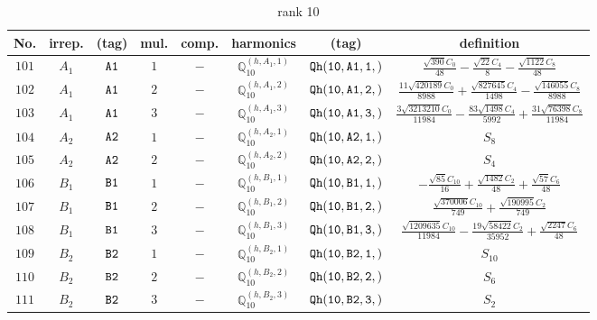 \documentclass[fleqn,8pt]{jsarticle}
\begin{document}
\begin{table}[ht!]
\begin{center}
\caption{rank 10}
\renewcommand{\arraystretch}{1.3}
\begin{tabular}{cccccccc} \hline \hline
No. & irrep. & (tag) & mul. & comp. & harmonics & (tag) & definition \\ \hline
$ 101 $ & $ A_{1} $ & $ {\tt A1} $ & $ 1 $ & $ - $ & $ \mathbb{Q}_{10}^{(h,A_{1},1)} $ & $ {\tt Qh(10,A1,1,)} $ & $ \frac{\sqrt{390} C_{0}}{48} - \frac{\sqrt{22} C_{4}}{8} - \frac{\sqrt{1122} C_{8}}{48} $ \\
$ 102 $ & $ A_{1} $ & $ {\tt A1} $ & $ 2 $ & $ - $ & $ \mathbb{Q}_{10}^{(h,A_{1},2)} $ & $ {\tt Qh(10,A1,2,)} $ & $ \frac{11 \sqrt{420189} C_{0}}{8988} + \frac{\sqrt{827645} C_{4}}{1498} - \frac{\sqrt{146055} C_{8}}{8988} $ \\
$ 103 $ & $ A_{1} $ & $ {\tt A1} $ & $ 3 $ & $ - $ & $ \mathbb{Q}_{10}^{(h,A_{1},3)} $ & $ {\tt Qh(10,A1,3,)} $ & $ \frac{3 \sqrt{3213210} C_{0}}{11984} - \frac{83 \sqrt{1498} C_{4}}{5992} + \frac{31 \sqrt{76398} C_{8}}{11984} $ \\
$ 104 $ & $ A_{2} $ & $ {\tt A2} $ & $ 1 $ & $ - $ & $ \mathbb{Q}_{10}^{(h,A_{2},1)} $ & $ {\tt Qh(10,A2,1,)} $ & $ S_{8} $ \\
$ 105 $ & $ A_{2} $ & $ {\tt A2} $ & $ 2 $ & $ - $ & $ \mathbb{Q}_{10}^{(h,A_{2},2)} $ & $ {\tt Qh(10,A2,2,)} $ & $ S_{4} $ \\
$ 106 $ & $ B_{1} $ & $ {\tt B1} $ & $ 1 $ & $ - $ & $ \mathbb{Q}_{10}^{(h,B_{1},1)} $ & $ {\tt Qh(10,B1,1,)} $ & $ - \frac{\sqrt{85} C_{10}}{16} + \frac{\sqrt{1482} C_{2}}{48} + \frac{\sqrt{57} C_{6}}{48} $ \\
$ 107 $ & $ B_{1} $ & $ {\tt B1} $ & $ 2 $ & $ - $ & $ \mathbb{Q}_{10}^{(h,B_{1},2)} $ & $ {\tt Qh(10,B1,2,)} $ & $ \frac{\sqrt{370006} C_{10}}{749} + \frac{\sqrt{190995} C_{2}}{749} $ \\
$ 108 $ & $ B_{1} $ & $ {\tt B1} $ & $ 3 $ & $ - $ & $ \mathbb{Q}_{10}^{(h,B_{1},3)} $ & $ {\tt Qh(10,B1,3,)} $ & $ \frac{\sqrt{1209635} C_{10}}{11984} - \frac{19 \sqrt{58422} C_{2}}{35952} + \frac{\sqrt{2247} C_{6}}{48} $ \\
$ 109 $ & $ B_{2} $ & $ {\tt B2} $ & $ 1 $ & $ - $ & $ \mathbb{Q}_{10}^{(h,B_{2},1)} $ & $ {\tt Qh(10,B2,1,)} $ & $ S_{10} $ \\
$ 110 $ & $ B_{2} $ & $ {\tt B2} $ & $ 2 $ & $ - $ & $ \mathbb{Q}_{10}^{(h,B_{2},2)} $ & $ {\tt Qh(10,B2,2,)} $ & $ S_{6} $ \\
$ 111 $ & $ B_{2} $ & $ {\tt B2} $ & $ 3 $ & $ - $ & $ \mathbb{Q}_{10}^{(h,B_{2},3)} $ & $ {\tt Qh(10,B2,3,)} $ & $ S_{2} $ \\

\end{tabular}
\end{center}
\end{table}
\end{document}
